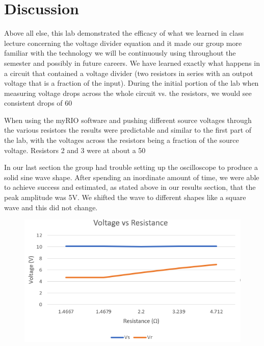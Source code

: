 \documentclass[10pt,twocolumn]{article}
\begin{document}
\section{Discussion}
Above all else, this lab demonstrated the efficacy of what we learned in class lecture concerning the voltage divider equation and it made our group more familiar with the technology we will be continuously using throughout the semester and possibly in future careers. We have learned exactly what happens in a circuit that contained a voltage divider (two resistors in series with an outpot voltage that is a fraction of the input). During the initial portion of the lab when measuring voltage drops across the whole circuit vs. the resistors, we would see consistent drops of 60%

When using the myRIO software and pushing different source voltages through the various resistors the results were predictable and similar to the first part of the lab, with the voltages across the resistors being a fraction of the source voltage. Resistors 2 and 3 were at about a 50%

In our last section the group had trouble setting up the oscilloscope to produce a solid sine wave shape. After spending an inordinate amount of time, we were able to achieve success and estimated, as stated above in our results section, that the peak amplitude was 5V. We shifted the wave to different shapes like a square wave and this did not change. 

\begin{figure}
	\centering
	\includegraphics[width=.9\linewidth]{figures/V vs R.PNG}
	\caption{}
	\label{fig:graph}
\end{figure}
\end{document}
